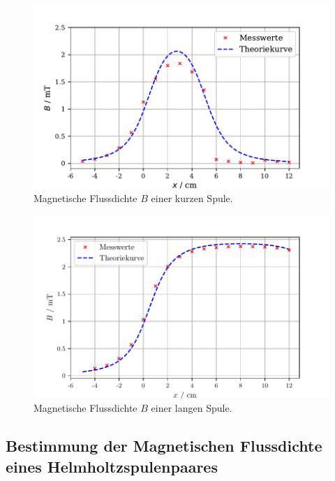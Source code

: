 \begin{figure}[H]
  \centering
  \includegraphics{kurz.pdf}
  \caption{Magnetische Flussdichte $B$ einer kurzen Spule.}
  \label{fig:plot}
\end{figure}



\begin{figure}[H]
  \centering
  \includegraphics{lang.pdf}
  \caption{Magnetische Flussdichte $B$ einer langen Spule.}
  \label{fig:plot}
\end{figure}


\subsection{Bestimmung der Magnetischen Flussdichte eines Helmholtzspulenpaares}





